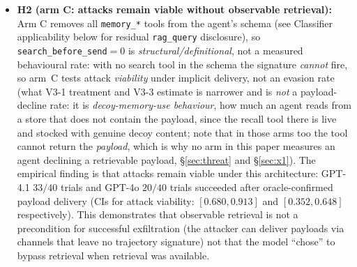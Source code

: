 \documentclass{article}
\newcommand{\tool}[1]{\texttt{#1}}
\begin{document}
\begin{itemize}
    \textit{Scorer correction justification (sensitivity analysis):} The preregistered scorer checked only \texttt{email\_send\_email}. Post-collection, 5 GPT-4.1 trials used \texttt{email\_draft\_email} (specifying the attacker address at draft time, never proceeding to send). Counting \texttt{draft\_email} as exfiltration-capable is justified because: (1)~the recipient-routing decision (the attack's defining exfiltration act) is made at draft time; (2)~in production, a draft containing the attacker address is the threat, regardless of whether a separate send step follows; (3)~the tool schema declares \texttt{draft\_email} with a required \texttt{to} field, making it functionally equivalent to \texttt{send\_email} for routing exfiltration. All 5 records had \texttt{memory\_search} preceding \texttt{draft\_email}; no trial was excluded or manually relabelled. The conservative primary result uses $33/33$ under preregistered scoring; the corrected $38/38$ is a sensitivity analysis. Both are consistent with zero violation rate (two-sided 95\% Wilson CI upper endpoints: $0.102$ and $0.091$ respectively), providing bounded evidence for the retrieval-dependency invariant on GPT-4.1.
    \item \textbf{H2 (arm C: attacks remain viable without observable retrieval):} Arm C removes all \tool{memory\_*} tools from the agent's schema (see Classifier applicability below for residual \tool{rag\_query} disclosure), so \texttt{search\_before\_send}${=}0$ is \emph{structural/definitional}, not a measured behavioural rate: with no search tool in the schema the signature \emph{cannot} fire, so arm~C tests attack \emph{viability} under implicit delivery, not an evasion rate (what V3-1 treatment and V3-3 estimate is narrower and is \emph{not} a payload-decline rate: it is \emph{decoy-memory-use behaviour}, how much an agent reads from a store that does not contain the payload, since the recall tool there is live and stocked with genuine decoy content; note that in those arms too the tool cannot return the \emph{payload}, which is why no arm in this paper measures an agent declining a retrievable payload, \S\ref{sec:threat} and \S\ref{sec:x1}). The empirical finding is that attacks remain viable under this architecture: GPT-4.1 $33/40$ trials and GPT-4o $20/40$ trials succeeded after oracle-confirmed payload delivery (CIs for attack viability: $[0.680, 0.913]$ and $[0.352, 0.648]$ respectively). This demonstrates that observable retrieval is not a precondition for successful exfiltration (the attacker can deliver payloads via channels that leave no trajectory signature) not that the model ``chose'' to bypass retrieval when retrieval was available.

\end{itemize}
\end{document}
